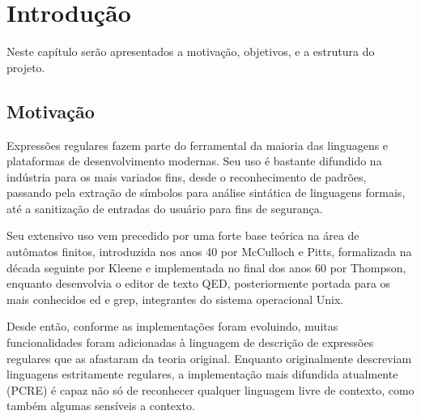 \documentclass[a4paper,12pt,oneside,onecolumn]{uerj}
\begin{document}




\sumario


\mainmatter

\chapter{Introdução}

Neste capítulo serão apresentados a motivação, objetivos, e a estrutura do projeto.

\section{Motivação}

Expressões regulares fazem parte do ferramental da maioria das linguagens e plataformas de desenvolvimento modernas. Seu uso é bastante difundido na indústria para os mais variados fins, desde o reconhecimento de padrões, passando pela extração de símbolos para análise sintática de linguagens formais, até a sanitização de entradas do usuário para fins de segurança.

Seu extensivo uso vem precedido por uma forte base teórica na área de autômatos finitos, introduzida nos anos 40 por McCulloch e Pitts, formalizada na década seguinte por Kleene e implementada no final dos anos 60 por Thompson, enquanto desenvolvia o editor de texto QED, posteriormente portada para os mais conhecidos ed e grep, integrantes do sistema operacional Unix.

Desde então, conforme as implementações foram evoluindo, muitas funcionalidades foram adicionadas à linguagem de descrição de expressões regulares que as afastaram da teoria original. Enquanto originalmente descreviam linguagens estritamente regulares, a implementação mais difundida atualmente (PCRE) é capaz não só de reconhecer qualquer linguagem livre de contexto, como também algumas sensíveis a contexto. 
\end{document}
